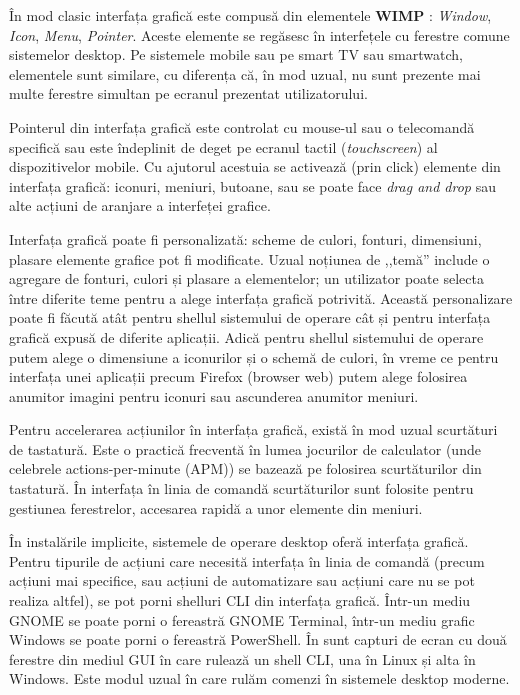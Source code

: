 În mod clasic interfața grafică este compusă din elementele \textbf{WIMP} : \textit{Window}, \textit{Icon}, \textit{Menu}, \textit{Pointer}.
Aceste elemente se regăsesc în interfețele cu ferestre comune sistemelor desktop.
Pe sistemele mobile sau pe smart TV sau smartwatch, elementele sunt similare, cu diferența că, în mod uzual, nu sunt prezente mai multe ferestre simultan pe ecranul prezentat utilizatorului.

Pointerul din interfața grafică este controlat cu mouse-ul sau o telecomandă specifică sau este îndeplinit de deget pe ecranul tactil (\textit{touchscreen}) al dispozitivelor mobile.
Cu ajutorul acestuia se activează (prin click) elemente din interfața grafică: iconuri, meniuri, butoane, sau se poate face \textit{drag and drop} sau alte acțiuni de aranjare a interfeței grafice.

Interfața grafică poate fi personalizată: scheme de culori, fonturi, dimensiuni, plasare elemente grafice pot fi modificate.
Uzual noțiunea de ,,temă'' include o agregare de fonturi, culori și plasare a elementelor;
un utilizator poate selecta între diferite teme pentru a alege interfața grafică potrivită.
Această personalizare poate fi făcută atât pentru shellul sistemului de operare cât și pentru interfața grafică expusă de diferite aplicații.
Adică pentru shellul sistemului de operare putem alege o dimensiune a iconurilor și o schemă de culori, în vreme ce pentru interfața unei aplicații precum Firefox (browser web) putem alege folosirea anumitor imagini pentru iconuri sau ascunderea anumitor meniuri.

Pentru accelerarea acțiunilor în interfața grafică, există în mod uzual scurtături de tastatură.
Este o practică frecventă în lumea jocurilor de calculator (unde celebrele actions-per-minute (APM)) se bazează pe folosirea scurtăturilor din tastatură.
În interfața în linia de comandă scurtăturilor sunt folosite pentru gestiunea ferestrelor, accesarea rapidă a unor elemente din meniuri.

În instalările implicite, sistemele de operare desktop oferă interfața grafică.
Pentru tipurile de acțiuni care necesită interfața în linia de comandă (precum acțiuni mai specifice, sau acțiuni de automatizare sau acțiuni care nu se pot realiza altfel), se pot porni shelluri CLI din interfața grafică.
Într-un mediu GNOME se poate porni o fereastră GNOME Terminal, într-un mediu grafic Windows se poate porni o fereastră PowerShell.
În  sunt capturi de ecran cu două ferestre din mediul GUI în care rulează un shell CLI, una în Linux și alta în Windows.
Este modul uzual în care rulăm comenzi în sistemele desktop moderne.

